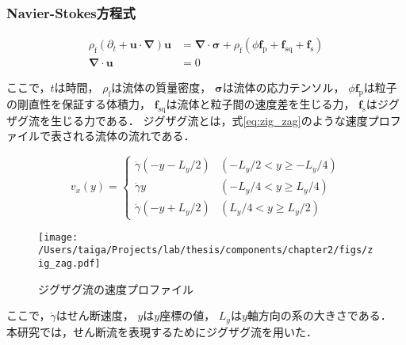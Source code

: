 \subsubsection{Navier-Stokes方程式}
    \begin{align}
        \rho_\mathrm{f} (\partial _t + \boldsymbol{u} \cdot \boldsymbol{\nabla} ) \boldsymbol{u} &= 
            \boldsymbol{\nabla} \cdot \boldsymbol{\sigma} + 
            \rho_\mathrm{f} \left( \phi \boldsymbol{f}_\mathrm{p} + \boldsymbol{f}_\mathrm{sq} + \boldsymbol{f}_\mathrm{s} \right) \\
        \boldsymbol{\nabla} \cdot \boldsymbol{u} &= 0
    \end{align}

ここで，$t$は時間，
$\rho_\mathrm{f}$は流体の質量密度，
$\boldsymbol{\sigma}$は流体の応力テンソル，
$\phi \boldsymbol{f}_\mathrm{p}$は粒子の剛直性を保証する体積力，
$\boldsymbol{f}_\mathrm{sq}$は流体と粒子間の速度差を生じる力，
$\boldsymbol{f}_\mathrm{s}$はジグザグ流を生じる力である．
ジグザグ流とは，式\eqref{eq:zig_zag}のような速度プロファイルで表される流体の流れである．

    \begin{equation}
        v_x(y) =
        \begin{cases}
            \dot{\gamma} \left( - y - L_y/2 \right) & (-L_y/2 < y \geq -L_y/4) \\
            \dot{\gamma} y                          & (-L_y/4 < y \geq  L_y/4) \\
            \dot{\gamma} \left( - y + L_y/2 \right) & ( L_y/4 < y \geq  L_y/2)
        \end{cases}
        \label{eq:zig_zag}
    \end{equation}

    \begin{figure}[htbp]
        \centering
        \texttt{[image: /Users/taiga/Projects/lab/thesis/components/chapter2/figs/zig\_zag.pdf]}
        \caption{ジグザグ流の速度プロファイル}
        \label{fig:zig_zag}
    \end{figure}

\noindent
ここで，$\dot{\gamma}$はせん断速度，
$y$は$y$座標の値，
$L_y$は$y$軸方向の系の大きさである．
本研究では，せん断流を表現するためにジグザグ流を用いた．
